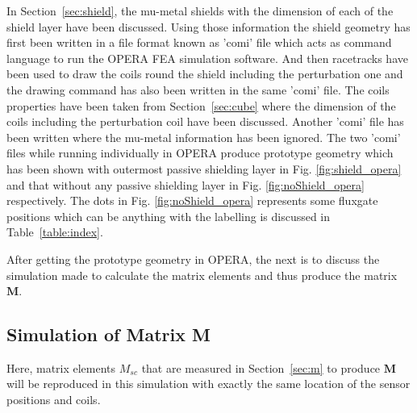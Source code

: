 In Section~\ref{sec:shield}, the mu-metal shields with the dimension of each of the shield layer have been discussed. Using those information the shield geometry has first been written in a file format known as 'comi' file which acts as command language to run the OPERA FEA simulation software. And then racetracks have been used to draw the coils round the shield including the perturbation one and the drawing command has also been written in the same 'comi' file. The coils properties have been taken from Section~\ref{sec:cube} where the dimension of the coils including the perturbation coil have been discussed. Another 'comi' file has been written where the mu-metal information has been ignored. The two 'comi' files while running individually in OPERA produce prototype geometry which has been shown with outermost passive shielding layer in Fig. \ref{fig:shield_opera} and that without any passive shielding layer in Fig. \ref{fig:noShield_opera} respectively. The dots in Fig. \ref{fig:noShield_opera} represents some fluxgate positions which can be anything with the labelling is discussed in Table~\ref{table:index}.


\FloatBarrier

After getting the prototype geometry in OPERA, the next is to discuss the simulation made to calculate the matrix elements and thus produce the matrix $\bm{M}$.

\subsection{Simulation of Matrix M}\label{sec:mSim}

Here, matrix elements $M_{sc}$ that are measured in Section~\ref{sec:m} to produce $\bm{M}$ will be reproduced in this simulation with exactly the same location of the sensor positions and coils. 

